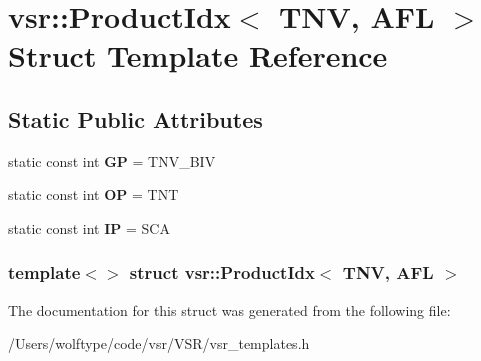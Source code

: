\hypertarget{structvsr_1_1_product_idx_3_01_t_n_v_00_01_a_f_l_01_4}{\section{vsr\-:\-:Product\-Idx$<$ T\-N\-V, A\-F\-L $>$ Struct Template Reference}
\label{structvsr_1_1_product_idx_3_01_t_n_v_00_01_a_f_l_01_4}
}
\subsection*{Static Public Attributes}
\begin{DoxyCompactItemize}
\item 
\hypertarget{structvsr_1_1_product_idx_3_01_t_n_v_00_01_a_f_l_01_4_a2f60ead93fbc09d62d26a13ca5880a71}{static const int {\bfseries G\-P} = T\-N\-V\-\_\-\-B\-I\-V}\label{structvsr_1_1_product_idx_3_01_t_n_v_00_01_a_f_l_01_4_a2f60ead93fbc09d62d26a13ca5880a71}

\item 
\hypertarget{structvsr_1_1_product_idx_3_01_t_n_v_00_01_a_f_l_01_4_abbf78fa16aff3f46557c8f2724559ee8}{static const int {\bfseries O\-P} = T\-N\-T}\label{structvsr_1_1_product_idx_3_01_t_n_v_00_01_a_f_l_01_4_abbf78fa16aff3f46557c8f2724559ee8}

\item 
\hypertarget{structvsr_1_1_product_idx_3_01_t_n_v_00_01_a_f_l_01_4_a784338c87de12c2d2e4856d89de876dd}{static const int {\bfseries I\-P} = S\-C\-A}\label{structvsr_1_1_product_idx_3_01_t_n_v_00_01_a_f_l_01_4_a784338c87de12c2d2e4856d89de876dd}

\end{DoxyCompactItemize}
\subsubsection*{template$<$$>$ struct vsr\-::\-Product\-Idx$<$ T\-N\-V, A\-F\-L $>$}



The documentation for this struct was generated from the following file\-:\begin{DoxyCompactItemize}
\item 
/\-Users/wolftype/code/vsr/\-V\-S\-R/vsr\-\_\-templates.\-h\end{DoxyCompactItemize}
